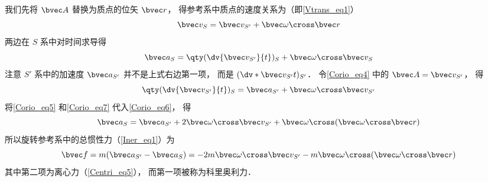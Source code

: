 我们先将 $\bvec A$ 替换为质点的位矢 $\bvec r$， 得参考系中质点的速度关系为（即\autoref{Vtrans_eq1}）
\begin{equation}\label{Corio_eq5}
\bvec v_{S} = \bvec v_{S'} + \bvec\omega\cross\bvec r
\end{equation}
两边在 $S$ 系中对时间求导得
\begin{equation}\label{Corio_eq6}
\bvec a_{S} = \qty(\dv{\bvec v_{S'}}{t})_{S} + \bvec\omega\cross\bvec v_{S}
\end{equation}
注意 $S'$ 系中的加速度 $\bvec a_{S'}$ 并不是上式右边第一项， 而是 $(\dv*{\bvec v_{S'}}{t})_{S'}$． 令\autoref{Corio_eq4} 中的 $\bvec A = \bvec v_{S'}$， 得
\begin{equation}\label{Corio_eq7}
\qty(\dv{\bvec v_{S'}}{t})_{S} = \bvec a_{S'} + \bvec\omega\cross\bvec v_{S'}
\end{equation}
将\autoref{Corio_eq5} 和\autoref{Corio_eq7} 代入\autoref{Corio_eq6}， 得
\begin{equation}
\bvec a_{S} = \bvec a_{S'} + 2\bvec\omega\cross\bvec v_{S'} + \bvec\omega\cross(\bvec\omega\cross\bvec r)
\end{equation}
所以旋转参考系中的总惯性力（\autoref{Iner_eq1}）为
\begin{equation}
\bvec f = m(\bvec a_{S'} - \bvec a_{S}) = -2m\bvec\omega\cross\bvec v_{S'} - m\bvec\omega\cross(\bvec\omega\cross\bvec r)
\end{equation}
其中第二项为离心力（\autoref{Centri_eq5}）， 而第一项被称为科里奥利力．
